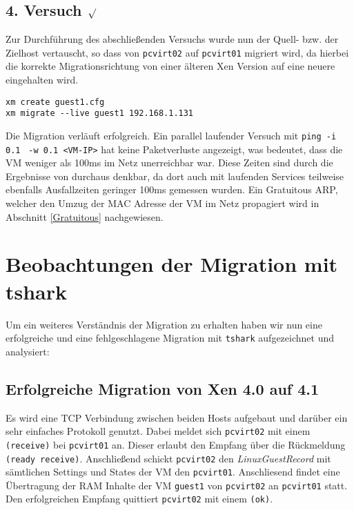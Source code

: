 \subsection {4. Versuch $\surd$ }
Zur Durchführung des abschließenden Versuchs wurde nun der Quell- bzw. der Zielhost vertauscht, so dass von \verb#pcvirt02# auf \verb#pcvirt01# migriert wird, da hierbei die korrekte Migrationsrichtung von einer älteren Xen Version auf eine neuere eingehalten wird.
\setupVerbatimOut
\begin{verbatim} 
xm create guest1.cfg
xm migrate --live guest1 192.168.1.131
\end{verbatim}

Die Migration verläuft erfolgreich. Ein parallel laufender Versuch mit \verb|ping -i 0.1| \verb| -w 0.1 <VM-IP>| hat keine Paketverluste angezeigt, was bedeutet, dass die VM weniger als 100ms im Netz unerreichbar war. Diese Zeiten sind durch die Ergebnisse von \cite{clark2005live} durchaus denkbar, da dort auch mit laufenden Services teilweise ebenfalls Ausfallzeiten geringer 100ms gemessen wurden. Ein Gratuitous
ARP, welcher den Umzug der MAC Adresse der VM im Netz propagiert wird in Abschnitt \ref{Gratuitous} nachgewiesen.


\section{Beobachtungen der Migration mit tshark} \label{mig_tcpdump}
Um ein weiteres Verständnis der Migration zu erhalten haben wir nun eine erfolgreiche und eine fehlgeschlagene Migration mit \verb#tshark# aufgezeichnet und analysiert:

\subsection{Erfolgreiche Migration von Xen 4.0 auf 4.1}
Es wird eine TCP Verbindung zwischen beiden Hosts aufgebaut und darüber ein sehr einfaches Protokoll genutzt. Dabei meldet sich \verb#pcvirt02# mit einem \verb|(receive)| bei \verb#pcvirt01# an. Dieser erlaubt den Empfang über die Rückmeldung \verb|(ready receive)|. Anschließend schickt \verb#pcvirt02# den \emph{LinuxGuestRecord} mit sämtlichen Settings und States der VM den \verb#pcvirt01#. Anschliesend findet eine Übertragung der RAM Inhalte der VM \verb#guest1# von \verb#pcvirt02#  an \verb#pcvirt01# statt. Den erfolgreichen Empfang quittiert \verb#pcvirt02# mit einem \verb|(ok)|.

